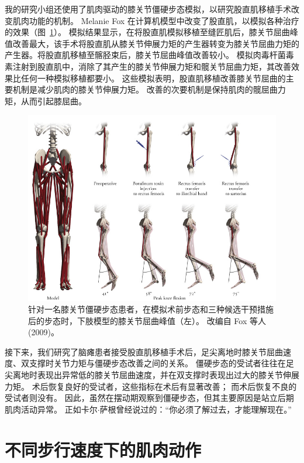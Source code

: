 我的研究小组还使用了肌肉驱动的膝关节僵硬步态模拟，以研究股直肌移植手术改变肌肉功能的机制。
Melanie Fox 在计算机模型中改变了股直肌，以模拟各种治疗的效果（图~\ref{fig:11_7}）。
模拟结果显示，在将股直肌模拟移植至缝匠肌后，膝关节屈曲峰值改善最大，该手术将股直肌从膝关节伸展力矩的产生器转变为膝关节屈曲力矩的产生器。将股直肌移植至髂胫束后，膝关节屈曲峰值改善较小。
模拟肉毒杆菌毒素注射到股直肌中，消除了其产生的膝关节伸展力矩和髋关节屈曲力矩，其改善效果比任何一种模拟移植都要小。
这些模拟表明，股直肌移植改善膝关节屈曲的主要机制是减少肌肉的膝关节伸展力矩。
改善的次要机制是保持肌肉的髋屈曲力矩，从而引起膝屈曲。


\begin{figure}[!htb]
	\centering
	\includegraphics[width=1.0\linewidth]{chap11/11_7}
	\caption{针对一名膝关节僵硬步态患者，在模拟术前步态和三种候选干预措施后的步态时，下肢模型的膝关节屈曲峰值（左）。
		改编自 Fox 等人 (2009)。 \label{fig:11_7}}
\end{figure}


接下来，我们研究了脑瘫患者接受股直肌移植手术后，足尖离地时膝关节屈曲速度、双支撑时关节力矩与僵硬步态改善之间的关系。
僵硬步态的受试者往往在足尖离地时表现出异常低的膝关节屈曲速度，并在双支撑时表现出过大的膝关节伸展力矩。
术后恢复良好的受试者，这些指标在术后有显著改善；
而术后恢复不良的受试者则没有。
因此，虽然在摆动期观察到僵硬步态，但其主要原因是站立后期肌肉活动异常。
正如卡尔$\cdot$萨根曾经说过的：“你必须了解过去，才能理解现在。”


\section{不同步行速度下的肌肉动作}

